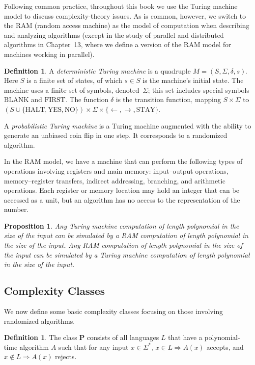 \documentclass[twoside,12pt]{book}
\theoremstyle{plain}
\newtheorem{proposition}[theorem]{Proposition}
\theoremstyle{definition}
\newtheorem{definition}[theorem]{Definition}
\theoremstyle{remark}
\begin{document}
Following common practice, throughout this book we use the Turing machine
model to discuss complexity-theory issues.  As is common, however, we switch
to the RAM (random access machine) as the model of computation when
describing and analyzing algorithms (except in the study of parallel and
distributed algorithms in Chapter~13, where we define a version of the RAM
model for machines working in parallel).

\begin{definition}
A \emph{deterministic Turing machine} is a quadruple $M=(S,\Sigma,\delta,s)$.
Here $S$ is a finite set of states, of which $s\in S$ is the machine's
initial state.  The machine uses a finite set of symbols, denoted~$\Sigma$;
this set includes special symbols $\mathrm{BLANK}$ and $\mathrm{FIRST}$.  The
function $\delta$ is the transition function, mapping
$S\times\Sigma$ to
$(S\cup\{\mathrm{HALT},\mathrm{YES},\mathrm{NO}\})\times\Sigma\times\{\leftarrow,
\rightarrow,\mathrm{STAY}\}$.
\end{definition}

A \emph{probabilistic Turing machine} is a Turing machine augmented with the
ability to generate an unbiased coin flip in one step.  It corresponds to a
randomized algorithm.

In the RAM model, we have a machine that can perform the following types of
operations involving registers and main memory: input--output operations,
memory--register transfers, indirect addressing, branching, and arithmetic
operations.  Each register or memory location may hold an integer that can be
accessed as a unit, but an algorithm has no access to the representation of
the number.

\begin{proposition}
Any Turing machine computation of length polynomial in the size of the input
can be simulated by a RAM computation of length polynomial in the size of the
input.  Any RAM computation of length polynomial in the size of the input can
be simulated by a Turing machine computation of length polynomial in the size
of the input.
\end{proposition}

\subsection{Complexity Classes}

We now define some basic complexity classes focusing on those involving
randomized algorithms.

\begin{definition}
The class $\mathbf{P}$ consists of all languages $L$ that have a
polynomial-time algorithm $A$ such that for any input $x\in\Sigma^*$,
$x\in L \Rightarrow A(x)$ accepts, and
$x\notin L \Rightarrow A(x)$ rejects.
\end{definition}
\end{document}
